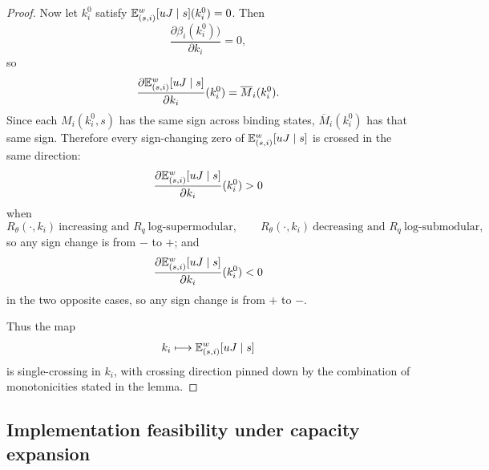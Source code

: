 \documentclass[master.tex]{subfiles}
\begin{document}
\begin{proof}
Now let $k_i^0$ satisfy $\mathbb{E}_{(s,i)}^w[uJ\mid s](k_i^0)=0$. Then
\[
\frac{\partial \beta_i(k_i^0))}{\partial k_i}=0,
\]
so
\[
\frac{\partial \mathbb{E}_{(s,i)}^w[uJ\mid s]}{\partial k_i}(k_i^0)=\overline M_i(k_i^0).
\]
Since each $M_i(k_i^0,s)$ has the same sign across binding states, $\overline M_i(k_i^0)$ has that same sign. Therefore every sign-changing zero of $\mathbb{E}_{(s,i)}^w[uJ\mid s]$ is crossed in the same direction:
\[
\frac{\partial \mathbb{E}_{(s,i)}^w[uJ\mid s]}{\partial k_i}(k_i^0)>0
\]
when
\[
R_\theta(\cdot,k_i)\ \text{increasing and }R_q\ \text{log-supermodular},
\qquad
R_\theta(\cdot,k_i)\ \text{decreasing and }R_q\ \text{log-submodular},
\]
so any sign change is from $-$ to $+$; and
\[
\frac{\partial \mathbb{E}_{(s,i)}^w[uJ\mid s]}{\partial k_i}(k_i^0)<0
\]
in the two opposite cases, so any sign change is from $+$ to $-$.

Thus the map
\[
k_i\longmapsto \mathbb{E}_{(s,i)}^w[uJ\mid s]
\]
is single-crossing in $k_i$, with crossing direction pinned down by the combination of monotonicities stated in the lemma.
\end{proof}

\subsection{Implementation feasibility under capacity expansion}
\end{document}
